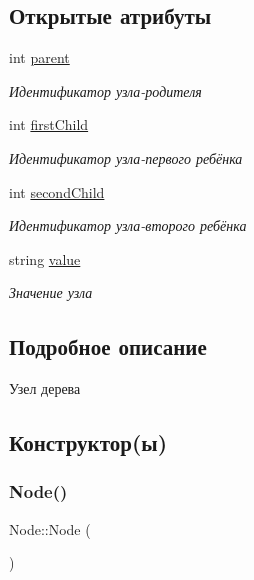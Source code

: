 \subsection*{Открытые атрибуты}
\begin{DoxyCompactItemize}
\item 
int \mbox{\hyperlink{struct_node_a122e2ce83616f32faa022223be3f50ab}{parent}}
\begin{DoxyCompactList}\small\item\em Идентификатор узла-\/родителя \end{DoxyCompactList}\item 
int \mbox{\hyperlink{struct_node_a6ed10d6fbe8f8c2f08d18dd10a89f872}{first\+Child}}
\begin{DoxyCompactList}\small\item\em Идентификатор узла-\/первого ребёнка \end{DoxyCompactList}\item 
int \mbox{\hyperlink{struct_node_a5ae4e8db98829aa5a678560df5ddd7ee}{second\+Child}}
\begin{DoxyCompactList}\small\item\em Идентификатор узла-\/второго ребёнка \end{DoxyCompactList}\item 
string \mbox{\hyperlink{struct_node_afbfe6bbcc5e6d53bb23ff4c29c178596}{value}}
\begin{DoxyCompactList}\small\item\em Значение узла \end{DoxyCompactList}\end{DoxyCompactItemize}


\subsection{Подробное описание}
Узел дерева 

\subsection{Конструктор(ы)}
\mbox{\label{struct_node_ad7a34779cad45d997bfd6d3d8043c75f}} 
\subsubsection{\texorpdfstring{Node()}{Node()}\hspace{0.1cm}{\footnotesize\ttfamily [1/2]}}
{\footnotesize\ttfamily Node\+::\+Node (\begin{DoxyParamCaption}{ }\end{DoxyParamCaption})\hspace{0.3cm}{\ttfamily [inline]}}



